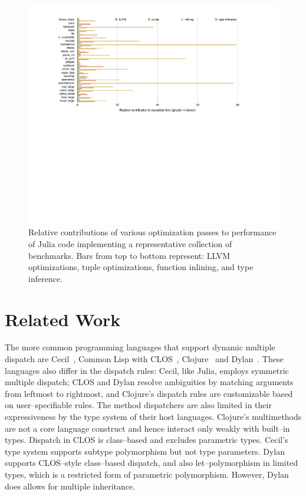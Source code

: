 \documentclass[pldi]{sigplanconf-pldi15}
\begin{document}
\begin{figure}
	\includegraphics[width=\textwidth]{fig-timings}
	\caption{Relative contributions of various optimization passes to
	performance of Julia code implementing a representative collection
	of benchmarks. Bars from top to bottom represent: LLVM
	optimizations, tuple optimizations, function inlining, and type inference.}
	\label{fig:timings}
\end{figure}



\section{Related Work}

The more common programming languages that support dynamic multiple dispatch
are Cecil~\cite{Chambers1992,Chambers1994}, Common Lisp with
CLOS~\cite{Bobrow1988}, Clojure~\cite{Hickey2008} and Dylan~\cite{dylanman}.
These languages also differ in the dispatch rules: Cecil, like Julia, employs
symmetric multiple dispatch; CLOS and Dylan resolve ambiguities by matching
arguments from leftmost to rightmost, and Clojure's dispatch rules are
customizable based on user--specifiable rules. The method dispatchers are also
limited in their expressiveness by the type system of their host languages.
Clojure's multimethods are not a core language construct and hence interact
only weakly with built--in types. Dispatch in CLOS is class--based and excludes
parametric types. Cecil's type system supports subtype polymorphism but not
type parameters. Dylan supports CLOS--style class--based dispatch, and also
let--polymorphism in limited types, which is a restricted form of parametric
polymorphism. However, Dylan does allows for multiple inheritance.
\end{document}
